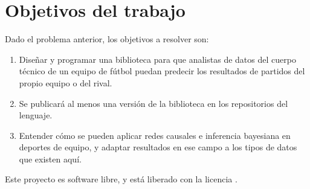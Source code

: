 \section{Objetivos del trabajo} \label{sect:goals}

Dado el problema anterior, los objetivos a resolver son:

\begin{enumerate}
    \item \label{obj:1} Diseñar y programar una biblioteca para que analistas de datos del cuerpo técnico de
    un equipo de fútbol puedan predecir los resultados de partidos del propio equipo o del rival. 
    \item \label{obj:2} Se publicará al menos una versión de la biblioteca en los repositorios del lenguaje.
    \item \label{obj:3} Entender cómo se pueden aplicar redes causales e inferencia 
    bayesiana en deportes de equipo, y adaptar resultados en ese campo a 
    los tipos de datos que existen aquí.
\end{enumerate}



Este proyecto es software libre, y está liberado con la licencia \cite{gplv3}.
